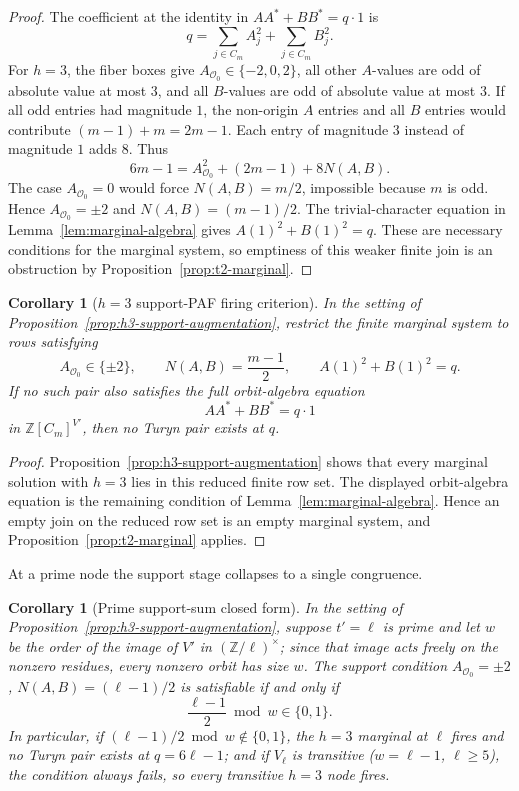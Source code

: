 \documentclass[11pt]{article}
\theoremstyle{plain}
\newtheorem{corollary}[theorem]{Corollary}
\theoremstyle{definition}
\theoremstyle{remark}
\newcommand{\Z}{\mathbb Z}
\begin{document}
\begin{proof}
The coefficient at the identity in $AA^*+BB^*=q\cdot1$ is
\[
  q=\sum_{j\in C_m}A_j^2+\sum_{j\in C_m}B_j^2 .
\]
For $h=3$, the fiber boxes give
$A_{\mathcal O_0}\in\{-2,0,2\}$, all other $A$-values are odd of absolute value
at most $3$, and all $B$-values are odd of absolute value at most $3$.  If all
odd entries had magnitude $1$, the non-origin $A$ entries and all $B$ entries
would contribute $(m-1)+m=2m-1$.  Each entry of magnitude $3$ instead of
magnitude $1$ adds $8$.  Thus
\[
  6m-1=A_{\mathcal O_0}^2+(2m-1)+8N(A,B).
\]
The case $A_{\mathcal O_0}=0$ would force $N(A,B)=m/2$, impossible because
$m$ is odd.  Hence $A_{\mathcal O_0}=\pm2$ and
$N(A,B)=(m-1)/2$.  The trivial-character equation in
Lemma~\ref{lem:marginal-algebra} gives $A(1)^2+B(1)^2=q$.  These are necessary
conditions for the marginal system, so emptiness of this weaker finite join is
an obstruction by Proposition~\ref{prop:t2-marginal}.
\end{proof}

\begin{corollary}[$h=3$ support-PAF firing criterion]\label{cor:h3-support-paf}
In the setting of Proposition~\ref{prop:h3-support-augmentation}, restrict the
finite marginal system to rows satisfying
\[
  A_{\mathcal O_0}\in\{\pm2\},\qquad N(A,B)=\frac{m-1}{2},
  \qquad A(1)^2+B(1)^2=q .
\]
If no such pair also satisfies the full orbit-algebra equation
\[
  AA^*+BB^*=q\cdot1
\]
in $\Z[C_m]^{V'}$, then no Turyn pair exists at $q$.
\end{corollary}

\begin{proof}
Proposition~\ref{prop:h3-support-augmentation} shows that every marginal
solution with $h=3$ lies in this reduced finite row set.  The displayed
orbit-algebra equation is the remaining condition of
Lemma~\ref{lem:marginal-algebra}.  Hence an empty join on the reduced row set
is an empty marginal system, and Proposition~\ref{prop:t2-marginal} applies.
\end{proof}

At a prime node the support stage collapses to a single congruence.

\begin{corollary}[Prime support-sum closed form]\label{cor:h3-support-sum-prime}
In the setting of Proposition~\ref{prop:h3-support-augmentation}, suppose
$t'=\ell$ is prime and let $w$ be the order of the image of $V'$ in
$(\Z/\ell)^\times$; since that image acts freely on the nonzero residues,
every nonzero orbit has size $w$.
The support condition $A_{\mathcal O_0}=\pm2$, $N(A,B)=(\ell-1)/2$ is
satisfiable if and only if
\[
  \frac{\ell-1}2\bmod w\in\{0,1\}.
\]
In particular, if $(\ell-1)/2\bmod w\notin\{0,1\}$, the $h=3$ marginal at
$\ell$ fires and no Turyn pair exists at $q=6\ell-1$; and if $V_\ell$ is
transitive ($w=\ell-1$, $\ell\ge5$), the condition always fails, so every
transitive $h=3$ node fires.
\end{corollary}
\end{document}
